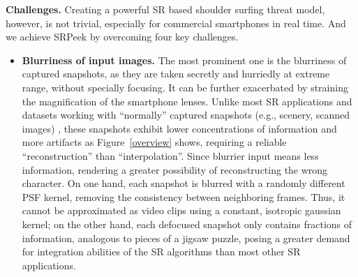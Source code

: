 \vspace{1mm}
\noindent
\textbf{Challenges.} Creating a powerful SR based shoulder surfing threat model, however, is not trivial, especially for commercial smartphones in real time. And we achieve \textsf{SRPeek} by overcoming four key challenges.

\begin{itemize}[leftmargin=*]
  \item \textbf{Blurriness of input images.} The most prominent one is the blurriness of captured snapshots, as they are taken secretly and hurriedly at extreme range, without specially focusing. It can be further exacerbated by straining the magnification of the smartphone lenses. Unlike most SR applications and datasets working with ``normally'' captured snapshots (e.g., scenery, scanned images) \cite{nasrollahi2020deep,lyn2020image}, these snapshots exhibit lower concentrations of information and more artifacts as Figure~\ref{overview} shows, requiring a reliable ``reconstruction'' than ``interpolation''. Since blurrier input means less information, rendering a greater possibility of reconstructing the wrong character. 
  On one hand, each snapshot is blurred with a randomly different PSF kernel, removing the consistency between neighboring frames. Thus, it cannot be approximated as video clips using a constant, isotropic gaussian kernel; on the other hand, each defocused snapshot only contains fractions of information, analogous to pieces of a jigsaw puzzle, posing a greater demand for integration abilities of the SR algorithms than most other SR applications.

\end{itemize}
